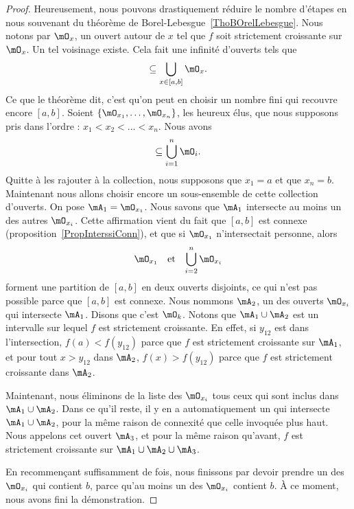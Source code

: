 \begin{proof}
	Heureusement, nous pouvons drastiquement réduire le nombre d'étapes en nous souvenant du théorème de Borel-Lebesgue~\ref{ThoBOrelLebesgue}. Nous notons par \( \mO_x\), un ouvert autour de \( x\) tel que \( f\) soit strictement croissante sur \( \mO_x\). Un tel voisinage existe. Cela fait une infinité d'ouverts tels que
	\begin{equation}
		[a,b]\subseteq\bigcup_{x\in[a,b]}\mO_x.
	\end{equation}
	Ce que le théorème dit, c'est qu'on peut en choisir un nombre fini qui recouvre encore \( [a,b]\). Soient \( \{ \mO_{x_1},\ldots,\mO_{x_n} \}\), les heureux élus, que nous supposons pris dans l'ordre : \( x_1<x_2<\ldots<x_n\). Nous avons
	\begin{equation}
		[a,b]\subseteq\bigcup_{i=1}^n\mO_i.
	\end{equation}
	Quitte à les rajouter à la collection, nous supposons que \( x_1=a\) et que \( x_n=b\). Maintenant nous allons choisir encore un sous-ensemble de cette collection d'ouverts. On pose \( \mA_1=\mO_{x_1}\). Nous savons que \( \mA_1\) intersecte au moins un des autres \( \mO_{x_i}\). Cette affirmation vient du fait que \( [a,b]\) est connexe (proposition~\ref{PropInterssiConn}), et que si \( \mO_{x_1}\) n'intersectait personne, alors
	\begin{equation}
		\begin{aligned}[]
			\mO_{x_1} &  & \text{et} &  & \bigcup_{i=2}^n\mO_{x_i}
		\end{aligned}
	\end{equation}
	forment une partition de \( [a,b]\) en deux ouverts disjoints, ce qui n'est pas possible parce que \( [a,b]\) est connexe. Nous nommons \( \mA_2\), un des ouverts \( \mO_{x_i}\) qui intersecte \( \mA_1\). Disons que c'est \( \mO_k\). Notons que \( \mA_1\cup\mA_2\) est un intervalle sur lequel \( f\) est strictement croissante. En effet, si \( y_{12}\) est dans l'intersection, \( f(a)<f(y_{12})\) parce que \( f\) est strictement croissante sur \( \mA_1\), et pour tout \( x>y_{12}\) dans \( \mA_2\), \( f(x)>f(y_{12})\) parce que \( f\) est strictement croissante dans \( \mA_2\).

	Maintenant, nous éliminons de la liste des \( \mO_{x_i}\) tous ceux qui sont inclus dans \( \mA_1\cup\mA_2\). Dans ce qu'il reste, il y en a automatiquement un qui intersecte \( \mA_1\cup\mA_2\), pour la même raison de connexité que celle invoquée plus haut. Nous appelons cet ouvert \( \mA_3\), et pour la même raison qu'avant, \( f\) est strictement croissante sur \( \mA_1\cup\mA_2\cup\mA_3\).

	En recommençant suffisamment de fois, nous finissons par devoir prendre un des \( \mO_{x_i}\) qui contient \( b\), parce qu'au moins un des \( \mO_{x_i}\) contient \( b\). À ce moment, nous avons fini la démonstration.
\end{proof}


